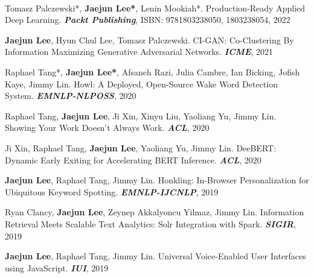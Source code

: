 
\vspace*{-0.40cm}
\hfill {}\vspace*{-0.30cm}

\vspace*{-0.15cm}
\\
\begin{cvenumerate}[1]
\item {Tomasz Palczewski*, \textcolor{gray!99!black}{\textbf{Jaejun Lee*}}, Lenin Mookiah*. Production-Ready Applied Deep Learning. \textbf{\textit{Packt Publishing}}, ISBN: 9781803238050, 1803238054, 2022}
\item \hypertarget{CI-GAN:ICME}{\textcolor{gray!99!black}{\textbf{Jaejun Lee}}, Hyun Chul Lee, Tomasz Palczewski. CI-GAN: Co-Clustering By Information Maximizing Generative Adversarial Networks. \textbf{\textit{ICME}}, 2021}
\item \hypertarget{howl:EMNLP}{Raphael Tang*, \textcolor{gray!99!black}{\textbf{Jaejun Lee*}}, Afsaneh Razi, Julia Cambre, Ian Bicking, Jofish Kaye, Jimmy Lin. Howl: A Deployed, Open-Source Wake Word Detection System. \textbf{\textit{EMNLP-NLPOSS}}, 2020}
\item \hypertarget{show:ACL}{Raphael Tang, \textcolor{gray!99!black}{\textbf{Jaejun Lee}}, Ji Xin, Xinyu Liu, Yaoliang Yu, Jimmy Lin. Showing Your Work Doesn't Always Work. \textbf{\textit{ACL}}, 2020}
\item \hypertarget{DeeBERT:ACL}{Ji Xin, Raphael Tang, \textcolor{gray!99!black}{\textbf{Jaejun Lee}}, Yaoliang Yu, Jimmy Lin. DeeBERT: Dynamic Early Exiting for Accelerating BERT Inference. \textbf{\textit{ACL}}, 2020}
\item \hypertarget{honkling:EMNLP}{\textcolor{gray!99!black}{\textbf{Jaejun Lee}}, Raphael Tang, Jimmy Lin. Honkling: In-Browser Personalization for Ubiquitous Keyword Spotting. \textbf{\textit{EMNLP-IJCNLP}}, 2019}
\item {Ryan Clancy, \textcolor{gray!99!black}{\textbf{Jaejun Lee}}, Zeynep Akkalyoncu Yilmaz, Jimmy Lin. Information Retrieval Meets Scalable Text Analytics: Solr Integration with Spark. \textbf{\textit{SIGIR}}, 2019}
\item \hypertarget{honkling:IUI}{\textcolor{gray!99!black}{\textbf{Jaejun Lee}}, Raphael Tang, Jimmy Lin. Universal Voice-Enabled User Interfaces using JavaScript. \textbf{\textit{IUI}}, 2019}
\end{cvenumerate}
\hfill

